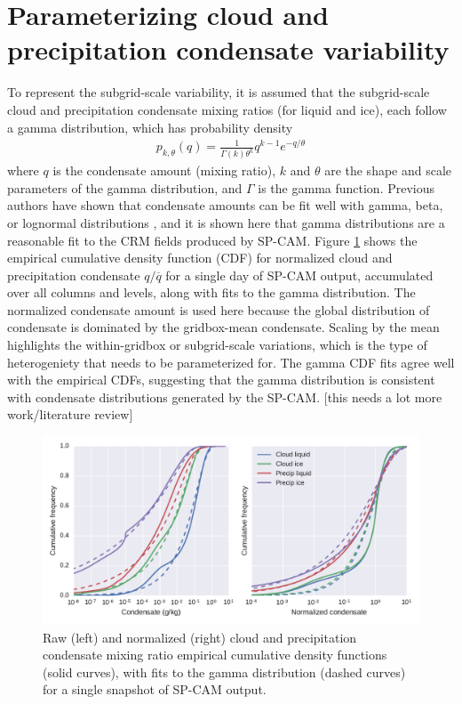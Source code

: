 \section{Parameterizing cloud and precipitation condensate variability}
\label{subgrid2_variability_section}
To represent the subgrid-scale variability, it is assumed that the subgrid-scale cloud and precipitation condensate mixing ratios (for liquid and ice), each follow a gamma distribution, which has probability density
\begin{gather}
    p_{k, \theta}(q) = \frac{1}{\Gamma(k) \theta^k} q^{k - 1} e^{-q/\theta}
\end{gather}
where $q$ is the condensate amount (mixing ratio), $k$ and $\theta$ are the shape and scale parameters of the gamma distribution, and $\Gamma$ is the gamma function. Previous authors have shown that condensate amounts can be fit well with gamma, beta, or lognormal distributions \citep[e.g.,][]{lee_et_al_2010}, and it is shown here that gamma distributions are a reasonable fit to the CRM fields produced by SP-CAM. Figure \ref{subgrid2_condensate_cdf} shows the empirical cumulative density function (CDF) for normalized cloud and precipitation condensate $q / \overline{q}$ for a single day of SP-CAM output, accumulated over all columns and levels, along with fits to the gamma distribution. The normalized condensate amount is used here because the global distribution of condensate is dominated by the gridbox-mean condensate. Scaling by the mean highlights the within-gridbox or subgrid-scale variations, which is the type of heterogeniety that needs to be parameterized for. The gamma CDF fits agree well with the empirical CDFs, suggesting that the gamma distribution is consistent with condensate distributions generated by the SP-CAM. [this needs a lot more work/literature review]

\begin{figure}
\centering
    \includegraphics[width=\columnwidth]{graphics/subgrid2_mxratio_cdf1.pdf}
    \caption{Raw (left) and normalized (right) cloud and precipitation condensate mixing ratio empirical cumulative density functions (solid curves), with fits to the gamma distribution (dashed curves) for a single snapshot of SP-CAM output.}
    \label{subgrid2_condensate_cdf}
\end{figure}

